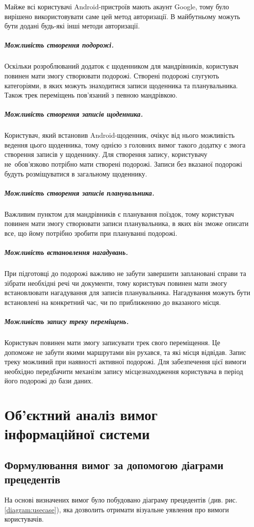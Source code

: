 \documentclass[../main.tex]{subfiles}
\begin{document}
Майже всі користувачі Android-пристроїв мають акаунт Google, тому було вирішено використовувати саме цей метод авторизації. В майбутньому можуть бути додані будь-які інші методи авторизації.

\subparagraph{Можливість створення подорожі.}
Оскільки розроблюваний додаток є щоденником для мандрівників, користувач повинен мати змогу створювати подорожі. Створені подорожі слугують категоріями, в яких можуть знаходитися записи щоденника та планувальника. Також трек переміщень пов'язаний з певною мандрівкою.

\subparagraph{Можливість створення записів щоденника.}
Користувач, який встановив Android-щоденник, очікує від нього можливість ведення цього щоденника, тому однією з головних вимог такого додатку є змога створення записів у щоденнику. Для створення запису, користувачу не~обов'язково потрібно мати створені подорожі. Записи без вказаної подорожі будуть розміщуватися в загальному щоденнику.

\subparagraph{Можливість створення записів планувальника.}
Важливим пунктом для мандрівників є планування поїздок, тому користувач повинен мати змогу створювати записи планувальника, в яких він зможе описати все, що йому потрібно зробити при плануванні подорожі.

\subparagraph{Можливість встановлення нагадувань.}
При підготовці до подорожі важливо не забути завершити заплановані справи та зібрати необхідні речі чи документи, тому користувач повинен мати змогу встановлювати нагадування для записів планувальника. Нагадування можуть бути встановлені на конкретний час, чи по приближенню до вказаного місця.

\subparagraph{Можливість запису треку переміщень.}
Користувач повинен мати змогу записувати трек свого переміщення. Це допоможе не забути якими маршрутами він рухався, та  які місця відвідав. Запис треку можливий при наявності активної подорожі. Для забезпечення цієї вимоги необхідно передбачити механізм запису місцезнаходження користувача в період його подорожі до бази даних.

\section{Об'єктний аналіз вимог інформаційної системи}

\subsection{Формулювання вимог за допомогою діаграми прецедентів}
На основі визначених вимог було побудовано діаграму прецедентів (див. рис. \ref{diagram:usecase}), яка дозволить отримати візуальне уявлення про вимоги користувачів.
\end{document}
